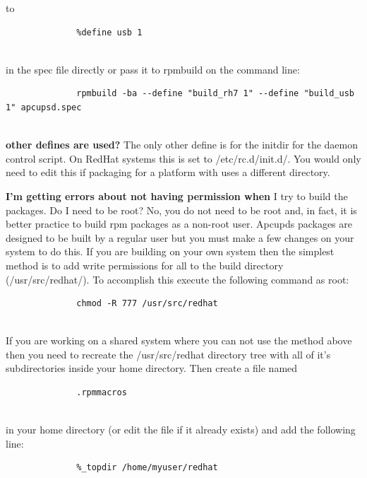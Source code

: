 \begin{description}
\begin{verbatim}
\end{verbatim}
\normalsize

to  

\footnotesize
\begin{verbatim}
              %define usb 1
     
\end{verbatim}
\normalsize

in the spec file directly or pass it to rpmbuild on the command line:  

\footnotesize
\begin{verbatim}
              rpmbuild -ba --define "build_rh7 1" --define "build_usb 1" apcupsd.spec
     
\end{verbatim}
\normalsize


\item {\bf {\bf other defines are used?}}
The only other define is for the initdir for the daemon control script. On
RedHat systems this is set to /etc/rc.d/init.d/.  You would only need to edit
this if packaging for a platform with uses a different directory.  

\item {\bf {\bf I'm getting errors about not having permission when}}
I try to build the packages.  Do I need to be root? No, you do not need to be
root and, in fact, it is better practice to build rpm packages as a non-root
user.  Apcupds packages are designed to be built by a regular user but you
must make a few changes on your system to do this.  If you are building on
your own system then the simplest method is to add write permissions for all
to the build directory (/usr/src/redhat/).  To accomplish this execute the
following command as root:  

\footnotesize
\begin{verbatim}
              chmod -R 777 /usr/src/redhat
     
\end{verbatim}
\normalsize

If you are working on a shared system where you can not use the method above
then you need to recreate the /usr/src/redhat directory tree with all of it's
subdirectories inside your home directory. Then create a file named  

\footnotesize
\begin{verbatim}
              .rpmmacros
     
\end{verbatim}
\normalsize

in your home directory (or edit the file if it already exists) and add the
following line:  

\footnotesize
\begin{verbatim}
              %_topdir /home/myuser/redhat
     
\end{verbatim}
\normalsize

\end{description}


